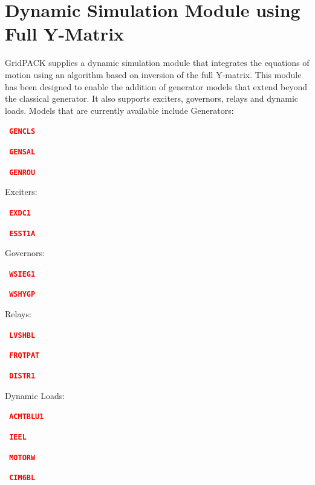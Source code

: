 \documentclass[12pt]{report} %
\begin{document}
\section{Dynamic Simulation Module using Full Y-Matrix}

GridPACK supplies a dynamic simulation module that integrates the equations of motion using an algorithm based on inversion of the full Y-matrix. This module has been designed to enable the addition of generator models that extend beyond the classical generator. It also supports exciters, governors, relays and dynamic loads. Models that are currently available include
Generators:

\textcolor{red}{\texttt{\textbf{  GENCLS}}}

\textcolor{red}{\texttt{\textbf{  GENSAL}}}

\textcolor{red}{\texttt{\textbf{  GENROU}}}

Exciters:

\textcolor{red}{\texttt{\textbf{  EXDC1}}}

\textcolor{red}{\texttt{\textbf{  ESST1A}}}

Governors:

\textcolor{red}{\texttt{\textbf{  WSIEG1}}}

\textcolor{red}{\texttt{\textbf{  WSHYGP}}}

Relays:

\textcolor{red}{\texttt{\textbf{  LVSHBL}}}

\textcolor{red}{\texttt{\textbf{  FRQTPAT}}}

\textcolor{red}{\texttt{\textbf{  DISTR1}}}

Dynamic Loads:

\textcolor{red}{\texttt{\textbf{  ACMTBLU1}}}

\textcolor{red}{\texttt{\textbf{  IEEL}}}

\textcolor{red}{\texttt{\textbf{  MOTORW}}}

\textcolor{red}{\texttt{\textbf{  CIM6BL}}}
\end{document}
